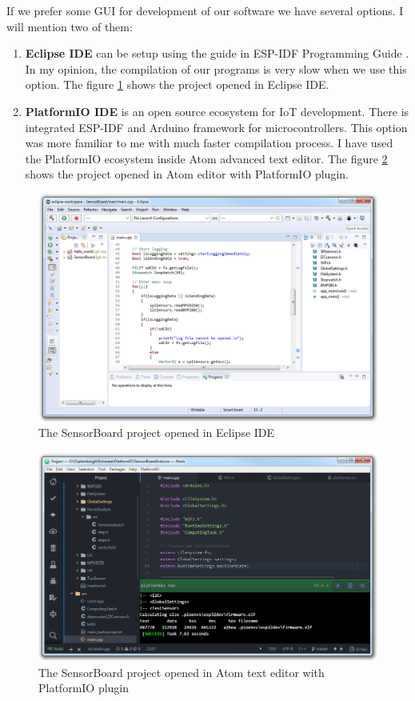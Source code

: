 If we prefer some GUI for development of our software we have several options. I will mention two of them:
\begin{enumerate}
    \item \textbf{Eclipse IDE} can be setup using the guide in \ac{ESP-IDF} Programming Guide \cite{ESP32eclipse}. In my opinion, the compilation of our programs is very slow when we use this option. The figure \ref{ESP32eclipse} shows the  project opened in Eclipse IDE.
    \item \textbf{PlatformIO IDE} is an open source ecosystem for \ac{IoT} development. \cite{PlatformIO} There is integrated \ac{ESP-IDF} and Arduino framework for  microcontrollers. This option was more familiar to me with much faster compilation process. I have used the PlatformIO ecosystem inside Atom \cite{AtomEditor} advanced text editor. The figure \ref{ESP32atom} shows the  project opened in Atom editor with PlatformIO plugin.
\end{enumerate}

\begin{figure}
    \centering
    \caption{The SensorBoard project opened in Eclipse IDE}
    \label{ESP32eclipse}
    \includegraphics[width=\linewidth]{img/ESP32eclipse.png}
\end{figure}

\begin{figure}
    \centering
    \caption{The SensorBoard project opened in Atom text editor with PlatformIO plugin}
    \label{ESP32atom}
    \includegraphics[width=\linewidth]{img/ESP32atom.png}
\end{figure}


